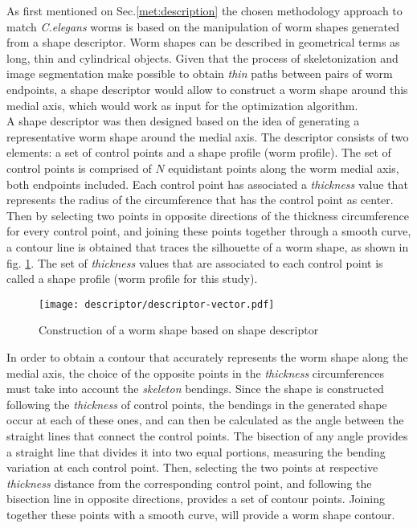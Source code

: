 As first mentioned on Sec.\ref{met:description} the chosen methodology approach 
to match \emph{C.elegans} worms is based on the manipulation of 
worm shapes generated from a shape descriptor.
Worm shapes can be described in geometrical terms as long, thin and cylindrical 
objects. Given that the process of skeletonization and image segmentation 
make possible to obtain \emph{thin} paths between pairs of worm endpoints, 
a shape descriptor would allow to construct a worm shape around this
medial axis, which would work as input for the 
optimization algorithm. \\

A shape descriptor was then designed based on the idea of generating a representative
worm shape around the medial axis. The descriptor consists of two 
elements: a set of control points and a shape profile (worm profile). 
The set of control points is comprised of $N$ equidistant points 
along the worm medial axis, both endpoints included.
Each control point has associated a \emph{thickness} value that represents the
radius of the circumference that has the control point as center. Then by selecting two points
in opposite directions of the thickness circumference for every control point, and joining
these points together through a smooth curve, a contour line is obtained that traces
the silhouette of a worm shape, as shown in fig. \ref{fig:descriptor}. 
The set of \emph{thickness} values that are associated to each control point
is called a shape profile (worm profile for this study).

\begin{figure}[h t b p ! H]
 \centering
   \texttt{[image: descriptor/descriptor-vector.pdf]}
 \caption{Construction of a worm shape based on shape descriptor}
 \label{fig:descriptor}
\end{figure}

In order to obtain a contour that accurately represents the worm shape along the 
medial axis, the choice of the opposite points in the \emph{thickness} circumferences 
must take into account the \emph{skeleton} bendings.
Since the shape is constructed following the \emph{thickness} of control points,
the bendings in the generated shape occur at each of these ones, and can then 
be calculated as the angle between the straight lines that connect
the control points. 
The bisection of any angle provides a straight line that divides it
into two equal portions, measuring the bending variation at each control point.
Then, selecting the two points at respective \emph{thickness} distance 
from the corresponding control point, and following the bisection line in opposite directions, provides a set of contour points. Joining 
together these points with a smooth curve, will provide a worm shape contour.\\

